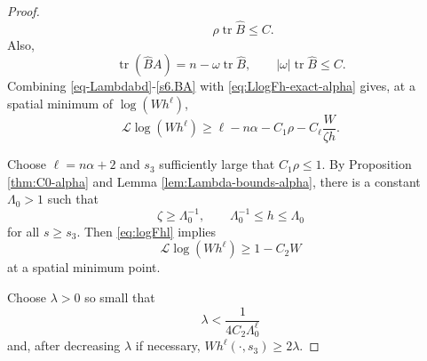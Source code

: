 \documentclass[10pt,a4paper]{amsart}
\DeclareMathOperator{\tr}{tr}
\begin{document}
\begin{proof}
\begin{equation*}
        \qquad
        \rho\tr\widehat B\le C.
\end{equation*}
Also,
\begin{equation}
        \tr(\widehat B A)
        =n-\omega\tr\widehat B,
        \qquad
        |\omega|\tr\widehat B\le C.
        \label{s6.BA}
\end{equation}
Combining \eqref{eq-Lambdabd}-\eqref{s6.BA} with \eqref{eq:LlogFh-exact-alpha} gives, at a spatial minimum of $\log(Wh^\ell)$,
\begin{equation}\label{eq:logFhl}
        \mathcal L\log(Wh^\ell)
        \ge
        \ell-n\alpha
        -C_1\rho
        -C_\ell\frac{W}{\zeta h}.
\end{equation}


Choose $\ell=n\alpha+2$ and $s_3$ sufficiently large that $C_1\rho\le 1$.  By Proposition \ref{thm:C0-alpha} and Lemma \ref{lem:Lambda-bounds-alpha}, there is a
constant  $\Lambda_0>1$ such that
\begin{equation*}
        \zeta\ge\Lambda_0^{-1},
        \qquad
        \Lambda_0^{-1}\le h\le\Lambda_0
\end{equation*}
for all $s\ge s_3$. Then \eqref{eq:logFhl} implies
\begin{equation*}
    \mathcal L\log(Wh^{\ell})\ge 1-C_2 W
\end{equation*}
at a spatial minimum point.



Choose $\lambda>0$ so small that
\begin{equation*}
        \lambda < \frac{1}{4C_2\Lambda_0^{\ell}}
\end{equation*}
and, after decreasing $\lambda$ if necessary, $ Wh^\ell(\cdot,s_3)\ge 2\lambda$.  


\end{proof}
\end{document}
